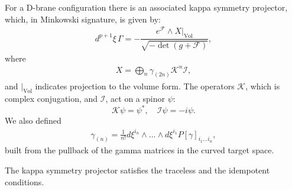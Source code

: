 For a D-brane configuration there is an associated kappa symmetry projector, which, in Minkowski signature, is given by\cite{Skenderis:2002vf}:
\begin{align}
d^{p+1} \xi \, \Gamma = - \dfrac{ e^{\mathcal{F}}\wedge X|_{\text{Vol}}}{\sqrt{-\det  (g+\mathcal{F})}},
\end{align}
where
\begin{align}
X = \bigoplus_n \gamma_{(2n)} \mathcal{K}^n \mathcal{I},
\end{align}
and $|_{\text{Vol}}$ indicates projection to the volume form.
The operators $\mathcal{K}$, which is complex conjugation, and $\mathcal{I}$, act on a spinor $\psi$:
\begin{equation}
 \mathcal{K} \psi = \psi^* , \quad \mathcal{I} \psi = -i \psi.
\end{equation}
We also defined
\begin{align}
\gamma_{(n)} = \frac{1}{n !}d\xi^{i_n}\wedge ... \wedge d\xi^{i_1} P[\gamma]_{i_1...i_n},
\end{align}
built from the pullback of the gamma matrices in the curved target space. 

The kappa symmetry projector satisfies the traceless and the idempotent conditions.

